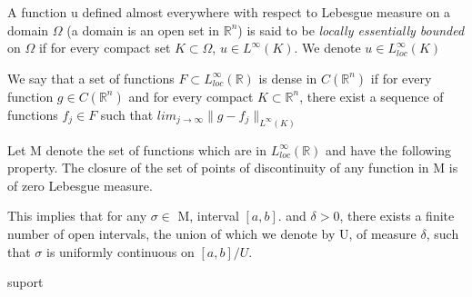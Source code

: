 \documentclass[../main.tex]{subfiles}
\begin{document}
\begin{definition}
	A function u defined almost everywhere with respect to Lebesgue measure on a domain $\Omega$ (a domain is an open set in $\mathbb{R}^n$) is said to be\emph{ locally essentially bounded }on $\Omega$ if for every compact set $K\subset \Omega$, $u\in L^{\infty}(K)$. We denote $u\in L_{loc}^{\infty}(K)$
\end{definition}

\begin{definition}We say that a set of functions $F\subset L_{loc}^{\infty}(\mathbb{R})$ is dense in $C(\mathbb{R}^n)$ if for every function $g\in C(\mathbb{R}^n)$ and for every compact $K\subset \mathbb{R}^n$, there exist a sequence of functions $f_j\in F$ such that $lim_{j\rightarrow\infty} \|g-f_j\|_{L^\infty(K)}$ 
\end{definition}

\begin{definition} Let M denote the set of functions which are in $L_{loc}^{\infty}(\mathbb{R})$ and have the following property. The closure of the set of points of discontinuity of any function in M is of zero Lebesgue measure. 
\begin{proposition}
This implies that for any $\sigma \in$ M, interval $[a,b] .$ and $\delta >0$, there exists a finite number of open intervals, the union of which we denote by U, of measure $\delta$, such that $\sigma$ is uniformly continuous on $[a,b]/U$. 
\end{proposition}
\end{definition}

\begin{definition} suport
	
\end{definition}
\end{document}
